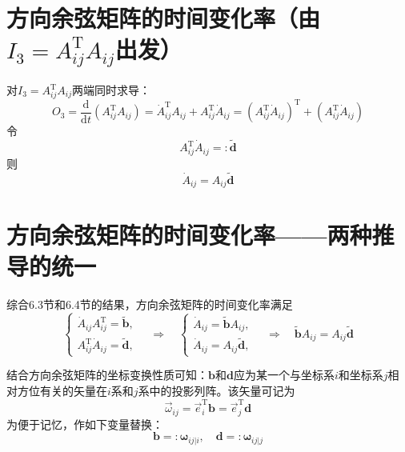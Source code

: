 \section{方向余弦矩阵的时间变化率（由$I_3 = A_{ij}^{\mathrm{T}}A_{ij}$出发）}

对$I_3 = A_{ij}^{\mathrm{T}}A_{ij}$两端同时求导：
\begin{equation}
O_3 = \frac{\mathrm{d}}{\mathrm{d}t}\left(A_{ij}^{\mathrm{T}}A_{ij}\right) = \dot{A}_{ij}^{\mathrm{T}}A_{ij} + A_{ij}^{\mathrm{T}}\dot{A}_{ij}
= \left(A_{ij}^{\mathrm{T}}\dot{A}_{ij}\right)^{\mathrm{T}} + \left(A_{ij}^{\mathrm{T}}\dot{A}_{ij}\right)
\end{equation}
令
\begin{equation}
A_{ij}^{\mathrm{T}}\dot{A}_{ij} =: \tilde{\boldsymbol{d}}
\end{equation}
则
\begin{equation}
\dot{A}_{ij} = A_{ij}\tilde{\boldsymbol{d}}
\end{equation}

\section{方向余弦矩阵的时间变化率——两种推导的统一}

综合6.3节和6.4节的结果，方向余弦矩阵的时间变化率满足
\begin{equation}
\begin{cases}
\dot{A}_{ij}A_{ij}^{\mathrm{T}} = \tilde{\boldsymbol{b}}, \\[4pt]
A_{ij}^{\mathrm{T}}\dot{A}_{ij} = \tilde{\boldsymbol{d}},
\end{cases}
\quad\Rightarrow\quad
\begin{cases}
\dot{A}_{ij} = \tilde{\boldsymbol{b}}A_{ij}, \\[4pt]
\dot{A}_{ij} = A_{ij}\tilde{\boldsymbol{d}},
\end{cases}
\quad\Rightarrow\quad
\tilde{\boldsymbol{b}}A_{ij} = A_{ij}\tilde{\boldsymbol{d}}
\end{equation}

结合方向余弦矩阵的坐标变换性质可知：$\boldsymbol{b}$和$\boldsymbol{d}$应为某一个与坐标系$i$和坐标系$j$相对方位有关的矢量在$i$系和$j$系中的投影列阵。该矢量可记为
\begin{equation}
\vec{\omega}_{ij} = \vec{e}_i^{\mathrm{T}}\boldsymbol{b} = \vec{e}_j^{\mathrm{T}}\boldsymbol{d}
\end{equation}
为便于记忆，作如下变量替换：
\begin{equation}
\boldsymbol{b} =: \boldsymbol{\omega}_{ij|i}, \quad \boldsymbol{d} =: \boldsymbol{\omega}_{ij|j}
\end{equation}

